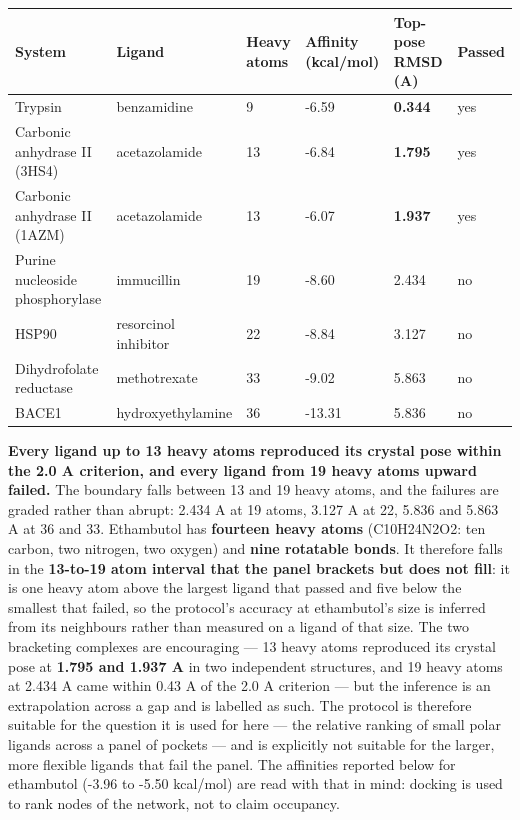 \documentclass[utf8]{FrontiersinVancouver}
\begin{document}
\begin{table}[htbp]
\centering
\begin{tabular}{llllll}
\hline
System & Ligand & Heavy atoms & Affinity (kcal/mol) & Top-pose RMSD (A) & Passed \\
\hline
Trypsin & benzamidine & 9 & -6.59 & \textbf{0.344} & yes \\
Carbonic anhydrase II (3HS4) & acetazolamide & 13 & -6.84 & \textbf{1.795} & yes \\
Carbonic anhydrase II (1AZM) & acetazolamide & 13 & -6.07 & \textbf{1.937} & yes \\
Purine nucleoside phosphorylase & immucillin & 19 & -8.60 & 2.434 & no \\
HSP90 & resorcinol inhibitor & 22 & -8.84 & 3.127 & no \\
Dihydrofolate reductase & methotrexate & 33 & -9.02 & 5.863 & no \\
BACE1 & hydroxyethylamine & 36 & -13.31 & 5.836 & no \\
\hline
\end{tabular}
\end{table}

\textbf{Every ligand up to 13 heavy atoms reproduced its crystal pose within the 2.0 A criterion, and every ligand from 19 heavy atoms upward failed.} The boundary falls between 13 and 19 heavy atoms, and the failures are graded rather than abrupt: 2.434 A at 19 atoms, 3.127 A at 22, 5.836 and 5.863 A at 36 and 33. Ethambutol has \textbf{fourteen heavy atoms} (C10H24N2O2: ten carbon, two nitrogen, two oxygen) and \textbf{nine rotatable bonds}. It therefore falls in the \textbf{13-to-19 atom interval that the panel brackets but does not fill}: it is one heavy atom above the largest ligand that passed and five below the smallest that failed, so the protocol's accuracy at ethambutol's size is inferred from its neighbours rather than measured on a ligand of that size. The two bracketing complexes are encouraging --- 13 heavy atoms reproduced its crystal pose at \textbf{1.795 and 1.937 A} in two independent structures, and 19 heavy atoms at 2.434 A came within 0.43 A of the 2.0 A criterion --- but the inference is an extrapolation across a gap and is labelled as such. The protocol is therefore suitable for the question it is used for here --- the relative ranking of small polar ligands across a panel of pockets --- and is explicitly not suitable for the larger, more flexible ligands that fail the panel. The affinities reported below for ethambutol (-3.96 to -5.50 kcal/mol) are read with that in mind: docking is used to rank nodes of the network, not to claim occupancy.
\end{document}
